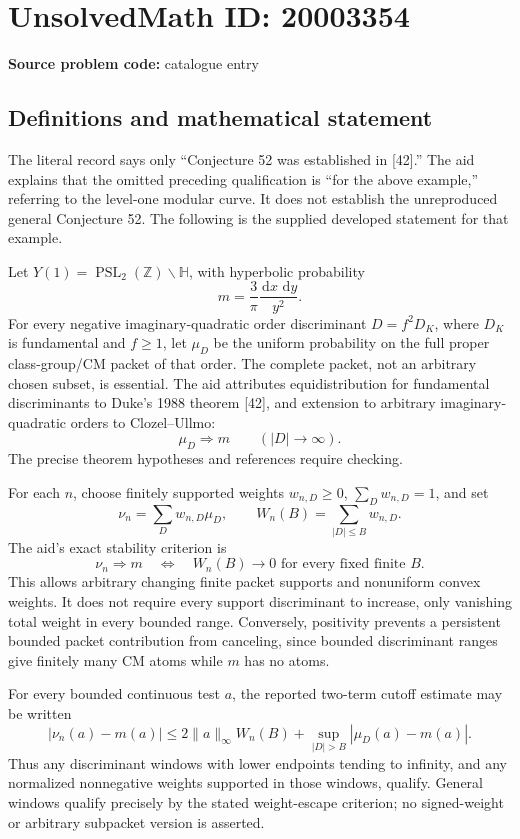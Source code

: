 \documentclass[11pt]{article}
\newcommand{\Z}{\mathbb{Z}}
\newcommand{\dd}{\,\mathrm{d}}
\begin{document}
\section*{UnsolvedMath ID: 20003354}
\textbf{Source problem code:} catalogue entry
\subsection{Definitions and mathematical statement}
The literal record says only ``Conjecture 52 was established in [42].'' The aid explains that the omitted preceding qualification is ``for the above example,'' referring to the level-one modular curve. It does not establish the unreproduced general Conjecture 52. The following is the supplied developed statement for that example.

Let \(Y(1)=\operatorname{PSL}_2(\Z)\backslash\mathbb H\), with hyperbolic probability
\[
 m=\frac3\pi\frac{\dd x\,\dd y}{y^2}.
\]
For every negative imaginary-quadratic order discriminant \(D=f^2D_K\), where \(D_K\) is fundamental and \(f\geq1\), let \(\mu_D\) be the uniform probability on the full proper class-group/CM packet of that order. The complete packet, not an arbitrary chosen subset, is essential. The aid attributes equidistribution for fundamental discriminants to Duke's 1988 theorem [42], and extension to arbitrary imaginary-quadratic orders to Clozel--Ullmo:
\[
 \mu_D\Longrightarrow m\qquad(|D|\to\infty).
\]
The precise theorem hypotheses and references require checking.

For each \(n\), choose finitely supported weights \(w_{n,D}\geq0\), \(\sum_Dw_{n,D}=1\), and set
\[
 \nu_n=\sum_Dw_{n,D}\mu_D,\qquad
 W_n(B)=\sum_{|D|\leq B}w_{n,D}.
\]
The aid's exact stability criterion is
\[
 \nu_n\Longrightarrow m
 \quad\Longleftrightarrow\quad
 W_n(B)\longrightarrow0\text{ for every fixed finite }B.
\]
This allows arbitrary changing finite packet supports and nonuniform convex weights. It does not require every support discriminant to increase, only vanishing total weight in every bounded range. Conversely, positivity prevents a persistent bounded packet contribution from canceling, since bounded discriminant ranges give finitely many CM atoms while \(m\) has no atoms.

For every bounded continuous test \(a\), the reported two-term cutoff estimate may be written
\[
 |\nu_n(a)-m(a)|
 \leq2\|a\|_\infty W_n(B)
   +\sup_{|D|>B}|\mu_D(a)-m(a)|.
\]
Thus any discriminant windows with lower endpoints tending to infinity, and any normalized nonnegative weights supported in those windows, qualify. General windows qualify precisely by the stated weight-escape criterion; no signed-weight or arbitrary subpacket version is asserted.
\end{document}
